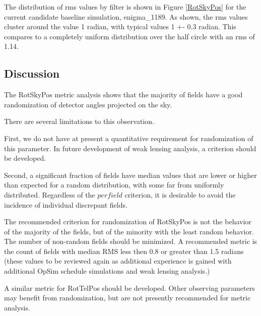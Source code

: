The distribution of rms values by filter is shown in Figure \ref{RotSkyPos} for the current candidate baseline simulation, enigma\_1189.  As shown, the rms values cluster around the value 1 radian,  with typical values 1 +- 0.3 radian.  This compares to a completely uniform distribution over the half circle with an rms of 1.14.  

\subsection{Discussion}

The RotSkyPos metric analysis shows that the majority of fields have a good randomization of detector angles projected on the sky.

There are several limitations to this observation.

First, we do not have at present a quantitative requirement for randomization of this parameter.  In future development of weak lensing analysis, a criterion should be developed.

Second, a significant fraction of fields  have median values that are lower or higher than expected for a random distribution, with some far from uniformly distributed.  Regardless of the $per field$ criterion, it is desirable to avoid the incidence of individual discrepant fields.

The recommended criterion for randomization of RotSkyPos is not the behavior of the majority of the fields, but of the minority with the least random behavior.  The number of non-random fields should be minimized.  A recommended metric is the count of fields with median RMS less then 0.8 or greater than 1.5 radians (these values to be reviewed again as additional experience is gained with additional OpSim schedule simulations and weak lensing analysis.)

A similar metric for RotTelPos should be developed. Other observing parameters may benefit from randomization, but are not presently recommended for metric analysis.